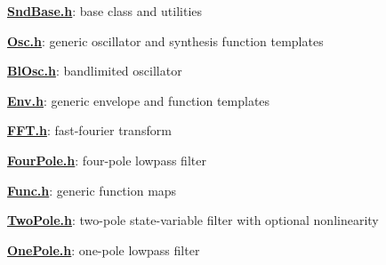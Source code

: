 {\bfseries \hyperlink{_snd_base_8h}{Snd\+Base.\+h}}\+: base class and utilities

{\bfseries \hyperlink{_osc_8h}{Osc.\+h}}\+: generic oscillator and synthesis function templates

{\bfseries \hyperlink{_bl_osc_8h}{Bl\+Osc.\+h}}\+: bandlimited oscillator

{\bfseries \hyperlink{_env_8h}{Env.\+h}}\+: generic envelope and function templates

{\bfseries \hyperlink{_f_f_t_8h}{F\+F\+T.\+h}}\+: fast-\/fourier transform

{\bfseries \hyperlink{_four_pole_8h}{Four\+Pole.\+h}}\+: four-\/pole lowpass filter

{\bfseries \hyperlink{_func_8h}{Func.\+h}}\+: generic function maps

{\bfseries \hyperlink{_two_pole_8h}{Two\+Pole.\+h}}\+: two-\/pole state-\/variable filter with optional nonlinearity

{\bfseries \hyperlink{_one_pole_8h}{One\+Pole.\+h}}\+: one-\/pole lowpass filter 